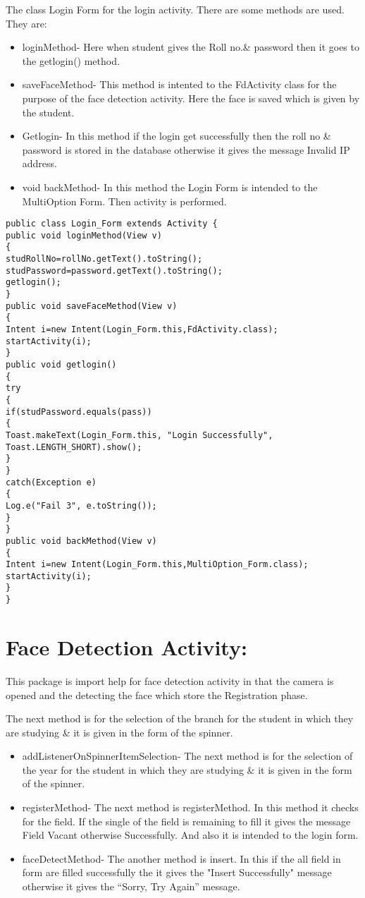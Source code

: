 The class Login Form for the login activity. There are some methods are used. They are:
\begin{itemize}
\item loginMethod-
 Here when student gives the Roll no.\& password then it goes to the getlogin() method.
\item saveFaceMethod- 
This method is intented to the FdActivity class for the purpose of the face detection activity. Here the face is saved which is given by the student.
\item Getlogin-
 In this method if the login get successfully then the roll no \& password is stored in the database otherwise it gives the message Invalid IP address.
\item void backMethod- 
 In this method the Login Form is intended to the MultiOption Form. Then activity is performed.
\end{itemize}

\begin{lstlisting}
public class Login_Form extends Activity {
public void loginMethod(View v)
{
studRollNo=rollNo.getText().toString();
studPassword=password.getText().toString();
getlogin();
}
public void saveFaceMethod(View v)
{
Intent i=new Intent(Login_Form.this,FdActivity.class);
startActivity(i);
}
public void getlogin()
{
try
{
if(studPassword.equals(pass))
{
Toast.makeText(Login_Form.this, "Login Successfully",      Toast.LENGTH_SHORT).show();
}
}
catch(Exception e)
{
Log.e("Fail 3", e.toString());
}
}
public void backMethod(View v)
{
Intent i=new Intent(Login_Form.this,MultiOption_Form.class);
startActivity(i);
}
}
\end{lstlisting}

\section{Face Detection Activity:}

This package is import help for face detection activity in that the camera is opened and the detecting the face which store the Registration phase.	

The next method is for the selection of the branch for the student in which they are studying \& it is given in the form of the spinner.
\begin{itemize}
\item  addListenerOnSpinnerItemSelection-
The next method is for the selection of the year for the student in which they are studying \& it is given in the form of the spinner.

\item registerMethod-
The next method is registerMethod. In this method it checks for the field. If the single of the field is remaining to fill it gives the message Field Vacant otherwise Successfully. And also it is intended to the login form.

\item  faceDetectMethod-
The another method is insert. In this if the all field in form are filled successfully the it gives the "Insert Successfully" message otherwise it gives the “Sorry, Try Again” message.
\end{itemize}


